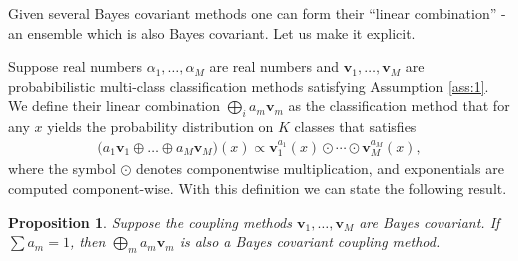 \documentclass[twoside,11pt]{article}
\newtheorem{prop}{Proposition}
\begin{document}
Given several Bayes covariant methods one can form  their ``linear combination'' - an ensemble which is also Bayes covariant. Let us make it explicit.

Suppose real numbers $\alpha_1, \ldots,\alpha_M$ are real numbers and $\boldsymbol{v}_1, \ldots, \boldsymbol{v}_M$ are probabibilistic multi-class classification methods satisfying Assumption \ref{ass:1}. We define their linear combination $\bigoplus_i a_m \boldsymbol{v}_m$ as the classification method that for any $x$ yields the probability distribution on $K$ classes that satisfies
\begin{align*}
 	\bigl(a_1 \boldsymbol{v}_1 \oplus \ldots \oplus a_M \boldsymbol{v}_M\bigr)(x) \propto \boldsymbol{v}_1^{a_1}(x) \odot \cdots \odot \boldsymbol{v}_M^{a_M}(x),
\end{align*}
where the symbol $\odot$ denotes componentwise multiplication, and exponentials are computed component-wise. With this definition we can state the following result.

\begin{prop}
Suppose the coupling methods $\boldsymbol{v}_1, \ldots, \boldsymbol{v}_M$ are Bayes covariant. If $\sum a_m = 1$, then $\bigoplus_m a_m \boldsymbol{v}_m$ is also a Bayes covariant coupling method.
\end{prop}
\end{document}
